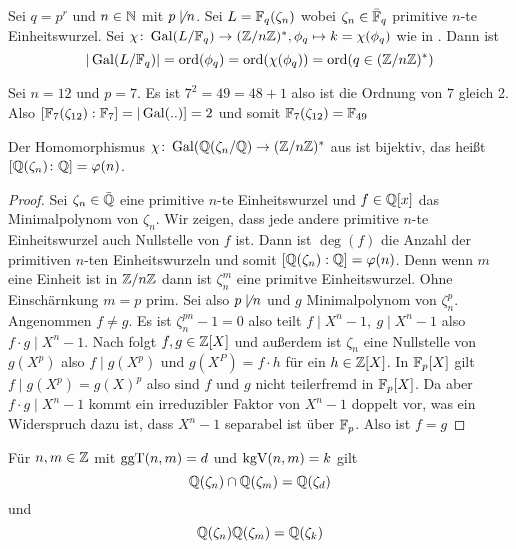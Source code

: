 \begin{Kor}
	Sei \(q=p^r\) und \(n\in\mathbb{N}\) mit \(p\not\mid n\). Sei \(L=\mathbb{F}_q(\zeta_n)\) wobei \(\zeta_n\in\bar {\mathbb{F}}_q\) primitive \(n\)-te Einheitswurzel.
	Sei \(\chi\colon \operatorname{Gal}(L/\mathbb{F}_q)\to (\mathbb{Z}/n\mathbb{Z})^*, \phi_q\mapsto k=\chi(\phi_q)\) wie in . Dann ist
	\[|\operatorname{Gal}(L/\mathbb{F}_q)|=\operatorname{ord}(\phi_q)=\operatorname{ord}(\chi(\phi_q))=\operatorname{ord}(q\in(\mathbb{Z}/n\mathbb{Z})^*)\]
\end{Kor}
\begin{Bsp}
	Sei \(n=12\) und \(p=7\). Es ist \(7^2=49 =48+1\) also ist die Ordnung von \(7\) gleich 2.
	Also \([\mathbb{F}_7(\zeta_{12}):\mathbb{F}_7]=|\operatorname{Gal}(..)]=2\) und somit \(\mathbb{F}_7(\zeta_{12})=\mathbb{F}_{49}\)
\end{Bsp}
\begin{Satz}
	Der Homomorphismus \(\chi\colon\operatorname{Gal}(\mathbb{Q}(\zeta_n/\mathbb{Q})\to(\mathbb{Z}/n\mathbb{Z})^*\) aus  ist bijektiv, das heißt \([\mathbb{Q}(\zeta_n)\colon \mathbb{Q}]=\varphi(n)\).
\end{Satz}
\begin{proof}
	Sei \(\zeta_n\in\bar{\mathbb{Q}}\) eine primitive \(n\)-te Einheitswurzel und \(f\in\mathbb{Q}[x]\) das Minimalpolynom von \(\zeta_n\).
	Wir zeigen, dass jede andere primitive \(n\)-te Einheitswurzel auch Nullstelle von
	\(f\) ist. Dann ist \(
	\deg(f)\) die Anzahl der primitiven \(n\)-ten Einheitswurzeln und somit 
	\([\mathbb{Q}(\zeta_n):\mathbb{Q}]=\varphi(n)\).
	Denn wenn \(m\) eine Einheit ist in \(\mathbb{Z}/n\mathbb{Z}\) dann ist \(\zeta_n^m\) eine primitve Einheitswurzel.
	Ohne Einschärnkung \(m=p\) prim.
	Sei also \(p\not\mid n\) und \(g\) Minimalpolynom von \(\zeta_n^p\). Angenommen \(f\neq g\).
	Es ist \(\zeta_n^{pn}-1=0\) also teilt \(f\mid X^n-1,\ g\mid X^n-1\) also \(f\cdot g\mid X^n-1\). Nach  folgt \(f,g\in\mathbb{Z}[X]\) und außerdem ist \(\zeta_n\) eine Nullstelle von \(g(X^p)\) also \(f\mid g(X^p)\) und \(g(X^P)=f\cdot h\) für ein \(h\in \mathbb{Z}[X]\).
	In \(\mathbb{F}_p[X]\) gilt \(f\mid g(X^p)=g(X)^p\) also sind \(f\) und \(g\) nicht teilerfremd in \(\mathbb{F}_p[X]\). Da aber \(f\cdot g\mid X^n-1\) kommt ein irreduzibler Faktor von \(X^n-1\) doppelt vor, was ein Widerspruch dazu ist, dass \(X^n-1\) separabel ist über \(\mathbb{F}_p\).
	Also ist \(f=g\)
\end{proof}
\begin{Kor}
	Für \(n,m\in\mathbb{Z}\) mit \(\operatorname{ggT}(n,m)=d\) und \(\operatorname{kgV}(n,m)=k\) gilt \[\mathbb{Q}(\zeta_n)\cap \mathbb{Q}(\zeta_m)=\mathbb{Q}(\zeta_d)\] und \[\mathbb{Q}(\zeta_n)\mathbb{Q}(\zeta_m)=\mathbb{Q}(\zeta_k)\]
\end{Kor}
